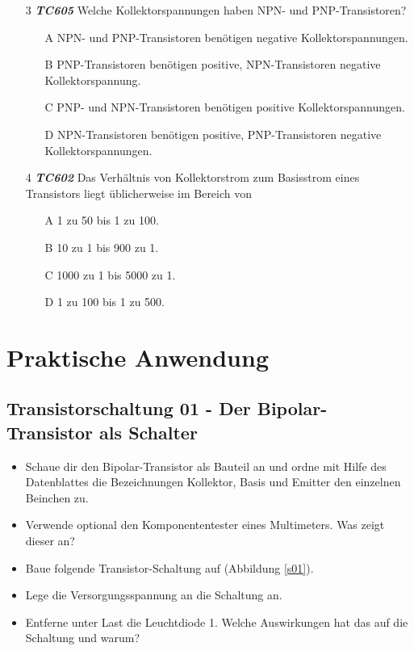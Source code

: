 \begin{enumerate} 
\itemsep1pt\parskip0pt
\item[3] \emph{\textbf{TC605}} Welche Kollektorspannungen haben NPN- und PNP-Transistoren?
	\begin{enumerate}
	\itemsep1pt\parskip0pt
		\item[A] NPN- und PNP-Transistoren benötigen negative Kollektorspannungen.
		\item[B] PNP-Transistoren benötigen positive, NPN-Transistoren negative Kollektorspannung.
		\item[C] PNP- und NPN-Transistoren benötigen positive Kollektorspannungen.
		\item[D] NPN-Transistoren benötigen positive, PNP-Transistoren negative Kollektorspannungen.
	\end{enumerate}
\end{enumerate}

\begin{enumerate} 
\item[4] \emph{\textbf{TC602}}  Das Verhältnis von Kollektorstrom zum Basisstrom eines Transistors liegt üblicherweise im Bereich von
	\begin{enumerate}
	\itemsep1pt\parskip0pt
		\item[A] 1 zu 50 bis 1 zu 100.
		\item[B] 10 zu 1 bis 900 zu 1.
		\item[C] 1000 zu 1 bis 5000 zu 1.
		\item[D] 1 zu 100 bis 1 zu 500.
	\end{enumerate}
\end{enumerate}


\section{Praktische Anwendung}

\subsection[Der Bipolar-Transistor als Schalter]{Transistorschaltung 01 - Der Bipolar-Transistor als Schalter}

\begin{itemize}
\itemsep1pt\parskip0pt
\item Schaue dir den Bipolar-Transistor als Bauteil an und ordne mit Hilfe des Datenblattes die Bezeichnungen Kollektor, Basis und Emitter den einzelnen Beinchen zu.
\item Verwende optional den Komponententester eines Multimeters. Was zeigt dieser an?
\item Baue folgende Transistor-Schaltung auf (Abbildung \ref{s01}). 
\item Lege die Versorgungsspannung an die Schaltung an.
\item Entferne unter Last die Leuchtdiode 1. Welche Auswirkungen hat das auf die Schaltung und warum?
\end{itemize}

